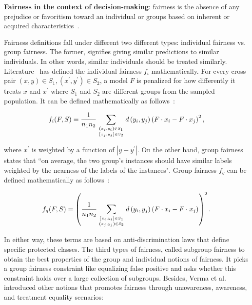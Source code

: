 \vspace{-1mm}
\begin{definition}
    \textbf{Fairness in the context of decision-making}: fairness is the absence of any prejudice or favoritism toward an individual or groups based on inherent or acquired characteristics~\cite{fairness_survey}. 
\end{definition}
\vspace{-1mm}

\hspace*{3.5mm} Fairness definitions fall under different two different types: individual fairness vs. group fairness. The former, signifies giving similar predictions to similar individuals. In other words, similar individuals should be treated similarly. Literature~\cite{berk2017convex} has defined the individual fairness $f_i$ mathematically. For every cross pair $(x,y) \in S_{1},\left(x^{\prime}, y^{\prime}\right) \in S_{2}$, a model $F$ is penalized for how differently it treats $x$ and $x^{\prime}$ where $S_{1}$ and $S_{2}$ are different groups from the sampled population. It can be defined mathematically as follows~\cite{berk2017convex}: 

\vspace{-4mm}
\begin{align}
    f_{i}(F, S)=\frac{1}{n_{1} n_{2}} \sum_{\left(x_{i}, y_{i}\right) \in S_{1} \atop\left(x_{j}, y_{j}\right) \in S_{2}} d\left(y_{i}, y_{j}\right)\left(F \cdot x_{i}-F \cdot x_{j}\right)^{2},
\end{align}
\vspace{-4mm}

\hspace*{3.5mm} where $x^{\prime}$ is weighted by a function of $\left|y-y^{\prime}\right|$. On the other hand, group fairness states that ``on average, the two group's instances should have similar labels weighted by the nearness of the labels of the instances". Group fairness $f_g$ can be defined mathematically as follows~\cite{berk2017convex}: 

\vspace{-4mm}
\begin{align}
    f_{g}(F, S)=\left(\frac{1}{n_{1} n_{2}} \sum_{\left(x_{i}, y_{i}\right) \in S_{1} \atop\left(x_{j}, y_{j}\right) \in S_{2}} d\left(y_{i}, y_{j}\right)\left(F \cdot x_{i}-F \cdot x_{j}\right)\right)^{2}.
\end{align}
\vspace{-4mm}

\hspace*{3.5mm} In either way, these terms are based on anti-discrimination laws that define specific protected classes.
The third types of fairness, called subgroup fairness to obtain the best properties of the group and individual notions of fairness. It picks a group fairness constraint like equalizing false positive and asks whether this constraint holds over a large collection of subgroups. Besides, Verma et al.\cite{verma2018fairness} introduced other notions that promotes fairness through unawareness, awareness, and treatment equality scenarios:    

